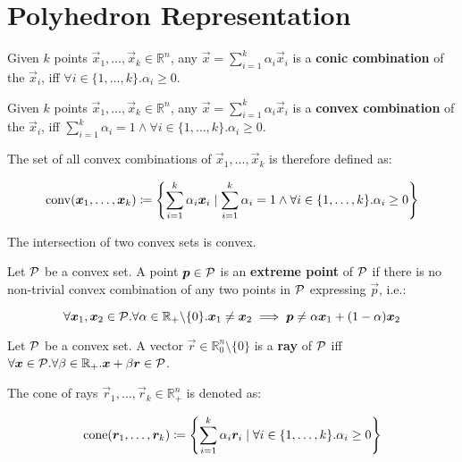 \section{Polyhedron Representation}\label{sec:preliminaries_poly}
\begin{definition}
Given $k$ points $\vec{x}_1, \dots, \vec{x}_k \in \mathbb{R}^n$, any $\vec{x} = \sum_{i=1}^{k} \alpha_i \vec{x}_i$ is a \textbf{conic combination} of the $\vec{x}_i$, iff $\forall i \in \{1, \dots, k\}. \alpha_i \geq 0$.
\end{definition}

\begin{definition}\label{def:convex}
Given $k$ points $\vec{x}_1, \dots, \vec{x}_k \in \mathbb{R}^n$, any $\vec{x} = \sum_{i=1}^{k} \alpha_i \vec{x}_i$ is a \textbf{convex combination} of the $\vec{x}_i$, iff $\sum_{i=1}^{k} \alpha_i = 1 \land \forall i \in \{1, \dots, k\}. \alpha_i \geq 0$.

The set of all convex combinations of $\vec{x}_1, \dots, \vec{x}_k$ is therefore defined as:

\begin{equation*}
\operatorname{conv}({\bm{x}}_1, \dots, {\bm{x}}_k) \coloneqq \left\{\sum_{i=1}^{k} \alpha_i {\bm{x}}_i \mid \sum_{i=1}^{k} \alpha_i = 1 \land \forall i \in \{1, \dots, k\}. \alpha_i \geq 0 \right\}
\end{equation*}
\end{definition}

\begin{corollary}\label{cor:intersection_convex}
The intersection of two convex sets is convex.
\end{corollary}

\begin{definition}
Let $\mathcal{P}$ be a convex set. A point ${\bm{p}} \in \mathcal{P}$ is an \textbf{extreme point} of $\mathcal{P}$ if there is no non-trivial convex combination of any two points in $\mathcal{P}$ expressing $\vec{p}$, i.e.:

\begin{equation*}
\forall {\bm{x}}_1, {\bm{x}}_2 \in \mathcal{P}. \forall \alpha \in \mathbb{R}_+ \backslash \{0\}. {\bm{x}}_1 \neq {\bm{x}}_2 \implies {\bm{p}} \neq \alpha {\bm{x}}_1 + (1 - \alpha) {\bm{x}}_2
\end{equation*}
\end{definition}

\begin{definition}\label{def:rays}
Let $\mathcal{P}$ be a convex set. A vector $\vec{r} \in \mathbb{R}_0^n \setminus \{0\}$ is a \textbf{ray} of $\mathcal{P}$ iff $\forall {\bm{x}} \in \mathcal{P}. \forall \beta \in \mathbb{R}_+. {\bm{x}} + \beta {\bm{r}} \in \mathcal{P}$.

The cone of rays $\vec{r}_1, \dots, \vec{r}_k \in \mathbb{R}_+^n$ is denoted as:

\begin{equation*}
\operatorname{cone}({\bm{r}}_1, \dots, {\bm{r}}_k) \coloneqq \left\{ \sum_{i=1}^{k} \alpha_i {\bm{r}}_i \mid \forall i \in \{1, \dots, k\}. \alpha_i \geq 0 \right\}
\end{equation*}
\end{definition}

